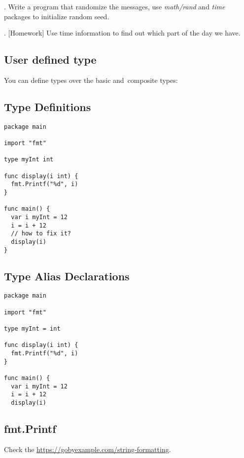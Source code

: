 \documentclass[11pt, letterpaper]{article}
\begin{document}
. Write a program that randomize the messages, use \emph{math/rand} and \emph{time} packages to initialize random seed.

. [Homework] Use time information to find out which part of the day we have.

\subsection{User defined type}

You can define types over the basic and~composite types:

\subsection{Type Definitions}

\begin{verbatim}
package main

import "fmt"

type myInt int

func display(i int) {
  fmt.Printf("%d", i)
}

func main() {
  var i myInt = 12
  i = i + 12
  // how to fix it?
  display(i)
}
\end{verbatim}

\subsection{Type Alias Declarations}

\begin{verbatim}
package main

import "fmt"

type myInt = int

func display(i int) {
  fmt.Printf("%d", i)
}

func main() {
  var i myInt = 12
  i = i + 12
  display(i)
\end{verbatim}

\subsection{fmt.Printf}

Check the \href{https://gobyexample.com/string-formatting}{https://gobyexample.com/string-formatting}.

\end{document}
